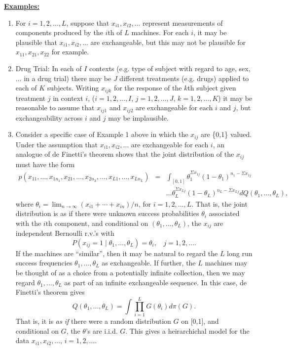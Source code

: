 \documentclass{article}
\begin{document}
\newpage
\underline{\bf Examples:}
\vskip 4mm
\begin{enumerate}
\item For $i=1,2,\ldots,L$, suppose that $x_{i1},x_{i2},\ldots$
  represent measurements of components produced by the $i$th of $L$
  machines.  For each $i$, it may be plausible that
  $x_{i1},x_{i2},\ldots$ are exchangeable, but this may not be
  plausible for $x_{11}, x_{21}, x_{22}$ for example.
\item Drug Trial:  In each of $I$ contexts (e.g. type of subject with
  regard to age, sex, $\ldots$ in a drug trial) there may be $J$ different
  treatments (e.g. drugs) applied to each of $K$ subjects.  Writing
  $x_{ijk}$ for the response of the $k$th subject given treatment $j$ in
  context $i$, ($i=1,2,\ldots,I$, $j=1,2,\ldots,J$, $k=1,2,\ldots,K$) it may
  be reasonable to assume that $x_{ij1}$ and $x_{ij2}$ are
  exchangeable for each $i$ and $j$, but exchangeability across $i$ and $j$
  may be implausible.
\item Consider a specific case of Example 1
  above in which the $x_{ij}$ are \{0,1\} valued.  Under the assumption
  that $x_{i1},x_{i2},\ldots$ are exchangeable for each $i$, an analogue
  of de Finetti's theorem shows that the joint distribution of the
  $x_{ij}$ must have the form
\begin{eqnarray*}p(x_{11},\ldots,x_{1 n_{1}},x_{21},\ldots,x_{2
  n_{2}},\ldots,x_{L1},\ldots,x_{L n_{L}})
&=&\int_{[0,1]} \theta_1^{\Sigma x_{1j}} (1-\theta_1)^{n_1 -
  \Sigma x_{1j}}\\
&& \ldots \theta_L^{\Sigma x_{Lj}} (1-\theta_L)^{n_L -
  \Sigma x_{Lj}} dQ(\theta_1,\ldots,\theta_L),
\end{eqnarray*}
where $\theta_i=\lim_{n\to\infty}(x_{i1}+\cdots+x_{i n})/n$,
for $i=1,2,\ldots,L$.
\vskip 4mm
That is, the joint distribution is as if there were unknown success
probabilities $\theta_i$ associated with the $i$th component, and
conditional on $(\theta_1,\ldots,\theta_L)$, the $x_{ij}$ are
independent Bernoulli r.v.'s with 
$$P(x_{ij}=1 \mid \theta_1,\ldots,\theta_L)=\theta_i,~~~~ j=1,2,\ldots.$$
\vskip 4mm
If the machines are ``similar'', then it may be natural to regard the
$L$ long run success frequencies $\theta_1,\ldots,\theta_L$ as
exchangeable.  If further, the $L$ machines may be thought of as a
choice from a potentially infinite collection, then we may regard
$\theta_1,\ldots,\theta_L$ as part of an infinite exchangeable
sequence.  In this case, de Finetti's theorem gives
$$Q(\theta_1,\ldots,\theta_L)=\int \prod_{i=1}^L G(\theta_i) d\pi(G).$$
That is, it is {\it as if} there were a random distribution $G$ on [0,1], and
conditional on $G$, the $\theta$'s are i.i.d. $G$.  This gives a
heirarchichal model for the data $x_{i1},x_{i2},\ldots$, $i=1,2,\ldots$.
\end{enumerate}
\end{document}
